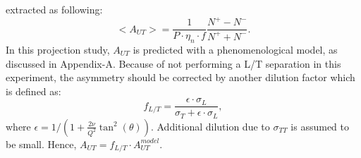 extracted as following:
\begin{equation}
   <A_{UT}> = \frac{1}{P\cdot\eta_{n}\cdot f} \frac{N^{+}-N^{-}}{N^{+}+N^{-}}.
   \label{asym_exp}
\end{equation}
In this projection study, $A_{UT}$ is predicted with a phenomenological model,
as discussed in Appendix-A. Because of not performing a L/T separation in this
experiment, the asymmetry should be corrected by another dilution factor which
is defined as:
\begin{equation}
  f_{L/T} =\frac{\epsilon\cdot\sigma_{L} }{\sigma_{T}+\epsilon\cdot\sigma_{L} },
\end{equation} 
where $\epsilon=1/(1+\frac{2\nu}{Q^{2}}\tan^{2}(\theta))$. Additional dilution
due to $\sigma_{TT}$ is assumed to be small.  Hence, $A_{UT} = f_{L/T}\cdot
A_{UT}^{model}$.


